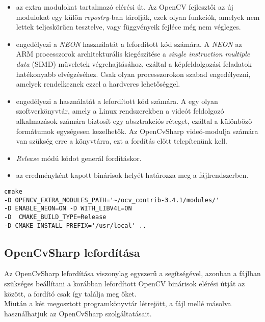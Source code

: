 \begin{itemize}
\item {} az extra modulokat tartalmazó elérési út. Az OpenCV fejlesztői az új modulokat egy külön \textit{repostry}-ban tárolják, ezek olyan funkciók, amelyek nem lettek teljeskörűen tesztelve, vagy függvényeik fejléce még nem végleges.
\item {} engedélyezi a \emph{NEON} használatát a lefordított kód számára. A \emph{NEON} az ARM processzorok architekturális kiegészítése a \textit{single instruction multiple data} (SIMD) műveletek végrehajtásához, ezáltal a képfeldolgozási feladatok hatékonyabb elvégzéséhez. Csak olyan processzorokon szabad engedélyezni, amelyek rendelkeznek ezzel a hardveres lehetőséggel.
\item {} engedélyezi a  használatát a lefordított kód számára. A  egy olyan szoftverkönyvtár, amely a Linux rendszerekben a videót feldolgozó alkalmazások számára biztosít egy absztrakciós réteget, ezáltal a különböző formátumok egységesen kezelhetők. Az OpenCvSharp videó-modulja számára van szükség erre a könyvtárra, ezt a fordítás előtt telepítenünk kell.
\item {} \textit{Release} módú kódot generál fordításkor.
\item {} az eredményként kapott binárisok helyét határozza meg a fájlrendszerben.
\end{itemize}

\begin{mdframed}[backgroundcolor=gray!20]
\begin{small}
\begin{lstlisting}
cmake
-D OPENCV_EXTRA_MODULES_PATH='~/ocv_contrib-3.4.1/modules/'
-D ENABLE_NEON=ON -D WITH_LIBV4L=ON 
-D  CMAKE_BUILD_TYPE=Release
-D CMAKE_INSTALL_PREFIX='/usr/local' ..
\end{lstlisting}
\end{small}
\end{mdframed}

\subsection{OpenCvSharp lefordítása}

Az OpenCvSharp lefordítása viszonylag egyszerű a  segítségével, azonban a  fájlban szükséges beállítani a korábban lefordított OpenCV binárisok elérési útját az  között, a fordító csak így találja meg őket.\\
Miután a két megosztott programkönyvtár létrejött, a  fájl mellé másolva használhatjuk az OpenCvSharp szolgáltatásait.

